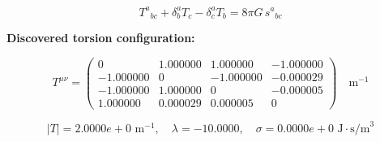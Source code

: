 
\begin{equation}
  T^a{}_{bc} + \delta^a_b T_c - \delta^a_c T_b = 8\pi G \, s^a{}_{bc}
\end{equation}

\textbf{Discovered torsion configuration:}

\begin{equation}
  T^{\mu\nu} = \begin{pmatrix}
    0 & 1.000000 & 1.000000 & -1.000000 \\
    -1.000000 & 0 & -1.000000 & -0.000029 \\
    -1.000000 & 1.000000 & 0 & -0.000005 \\
    1.000000 & 0.000029 & 0.000005 & 0
  \end{pmatrix} \quad \text{m}^{-1}
\end{equation}

\begin{equation}
  |T| = 2.0000e+0 \text{ m}^{-1}, \quad
  \lambda = -10.0000, \quad
  \sigma = 0.0000e+0 \text{ J}\cdot\text{s/m}^3
\end{equation}